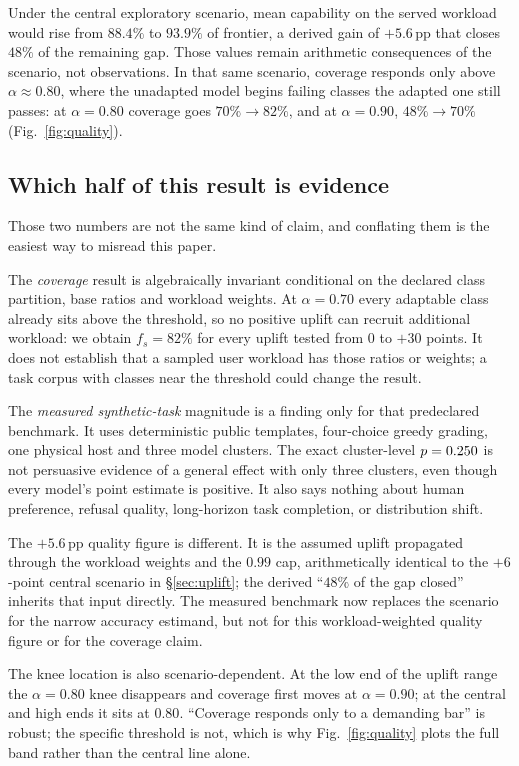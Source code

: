 \documentclass[conference]{IEEEtran}
\newcommand{\fs}{f_{s}}
\newcommand{\pp}{\,\text{pp}}
\begin{document}
Under the central exploratory scenario, mean capability on the served workload
would rise from $88.4\%$ to $93.9\%$ of frontier, a derived gain of $+5.6\pp$
that closes $48\%$ of the remaining gap. Those values remain arithmetic
consequences of the scenario, not observations. In that same scenario,
coverage responds only above $\alpha \approx 0.80$,
where the unadapted model begins failing classes the adapted one still passes:
at $\alpha = 0.80$ coverage goes $70\% \rightarrow 82\%$, and at
$\alpha = 0.90$, $48\% \rightarrow 70\%$ (Fig.~\ref{fig:quality}).

\subsection{Which half of this result is evidence}
\label{sec:whatisevidence}
Those two numbers are not the same kind of claim, and conflating them is the
easiest way to misread this paper.

The \emph{coverage} result is algebraically invariant conditional on the
declared class partition, base ratios and workload weights. At $\alpha = 0.70$
every adaptable class already sits above the threshold, so no positive uplift
can recruit additional workload: we obtain $\fs = 82\%$ for every uplift tested
from $0$ to $+30$ points. It does not establish that a sampled user workload
has those ratios or weights; a task corpus with classes near the threshold
could change the result.

The \emph{measured synthetic-task} magnitude is a finding only for that
predeclared benchmark. It uses deterministic public templates, four-choice
greedy grading, one physical host and three model clusters. The exact
cluster-level $p=0.250$ is not persuasive evidence of a general
effect with only three clusters, even though every model's point estimate is
positive. It also says nothing about human preference, refusal quality,
long-horizon task completion, or distribution shift.

The $+5.6\pp$ quality figure is different. It is the assumed uplift propagated
through the workload weights and the $0.99$ cap, arithmetically identical to
the $+6$-point central scenario in \S\ref{sec:uplift}; the derived ``$48\%$ of
the gap closed'' inherits that input directly. The measured benchmark now
replaces the scenario for the narrow accuracy estimand, but not for this
workload-weighted quality figure or for the coverage claim.

The knee location is also scenario-dependent. At the low end of the uplift range the
$\alpha = 0.80$ knee disappears and coverage first moves at $\alpha = 0.90$; at
the central and high ends it sits at $0.80$. ``Coverage responds only to a
demanding bar'' is robust; the specific threshold is not, which is why
Fig.~\ref{fig:quality} plots the full band rather than the central line alone.
\end{document}
